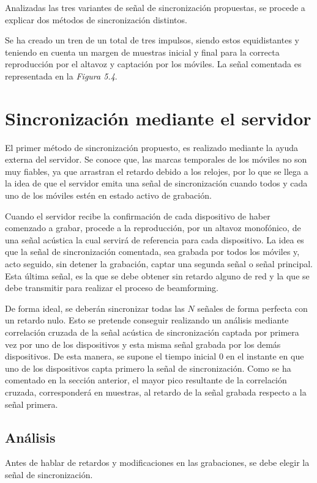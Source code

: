 \documentclass[a4paper,11pt]{book}
\begin{document}
Analizadas las tres variantes de señal de sincronización propuestas, se procede a explicar dos métodos de sincronización distintos.

Se ha creado un tren de un total de tres impulsos, siendo estos equidistantes y teniendo en cuenta un margen de muestras inicial y final para la correcta reproducción por el altavoz y captación por los móviles. La señal comentada es representada en la \textit{Figura 5.4}.



\section{Sincronización mediante el servidor}

El primer método de sincronización propuesto, es realizado mediante la ayuda externa del servidor. Se conoce que, las marcas temporales de los móviles no son muy fiables, ya que arrastran el retardo debido a los relojes, por lo que se llega a la idea de que el servidor emita una señal de sincronización cuando todos y cada uno de los móviles estén en estado activo de grabación.

Cuando el servidor recibe la confirmación de cada dispositivo de haber comenzado a grabar, procede a la reproducción, por un altavoz monofónico, de una señal acústica la cual servirá de referencia para cada dispositivo. La idea es que la señal de sincronización comentada, sea grabada por todos los móviles y, acto seguido, sin detener la grabación, captar una segunda señal o señal principal. Esta última señal, es la que se debe obtener sin retardo alguno de red y la que se debe transmitir para realizar el proceso de beamforming.

De forma ideal, se deberán sincronizar todas las  $N$ señales de forma perfecta con un retardo nulo. Esto se pretende conseguir realizando un análisis mediante correlación cruzada de la señal acústica de sincronización captada por primera vez por uno de los dispositivos y esta misma señal grabada por los demás dispositivos. De esta manera, se supone el tiempo inicial 0 en el instante en que uno de los dispositivos capta primero la señal de sincronización. Como se ha comentado en la sección anterior, el mayor pico resultante de la correlación cruzada, corresponderá en muestras, al retardo de la señal grabada respecto a la señal primera.

\subsection{Análisis}
Antes de hablar de retardos y modificaciones en las grabaciones, se debe elegir la señal de sincronización.
\end{document}
